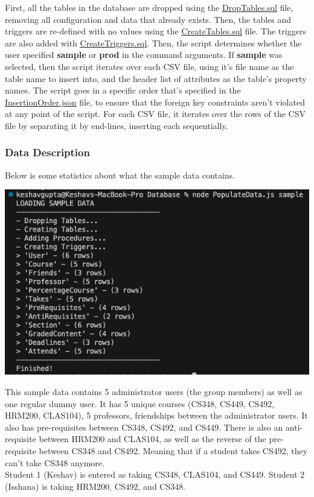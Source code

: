 \documentclass[12pt, a4paper]{article}
\begin{document}
First, all the tables in the database are dropped using the \underline{\href{https://github.com/Kggupta/DegreeMap/tree/main/Database/Queries}{DropTables.sql}} file, removing all configuration and data that already exists. Then, the tables and triggers are re-defined with no values using the \underline{\href{https://github.com/Kggupta/DegreeMap/tree/main/Database/Queries}{CreateTables.sql}} file. The triggers are also added with \underline{\href{https://github.com/Kggupta/DegreeMap/tree/main/Database/Queries}{CreateTriggers.sql}}. Then, the script determines whether the user specified \textbf{sample} or \textbf{prod} in the command arguments. If \textbf{sample} was selected, then the script iterates over each CSV file, using it's file name as the table name to insert into, and the header list of attributes as the table's property names. The script goes in a specific order that's specified in the \underline{\href{https://github.com/Kggupta/DegreeMap/blob/main/Database/InsertionOrder.json}{InsertionOrder.json}} file, to ensure that the foreign key constraints aren't violated at any point of the script. For each CSV file, it iterates over the rows of the CSV file by separating it by end-lines, inserting each sequentially.
\subsubsection*{Data Description}
Below is some statistics about what the sample data contains.
\begin{center}
    \includegraphics[width=\textwidth]{sampledata}
\end{center}

This sample data contains 5 administrator users (the group members) as well as one regular dummy user. It has 5 unique courses (CS348, CS449, CS492, HRM200, CLAS104), 5 professors, friendships between the administrator users. It also has pre-requisites between CS348, CS492, and CS449. There is also an anti-requisite between HRM200 and CLAS104, as well as the reverse of the pre-requisite between CS348 and CS492. Meaning that if a student takes CS492, they can't take CS348 anymore.\\
Student 1 (Keshav) is entered as taking CS348, CLAS104, and CS449. Student 2 (Isshana) is taking HRM200, CS492, and CS348.\\
\end{document}
